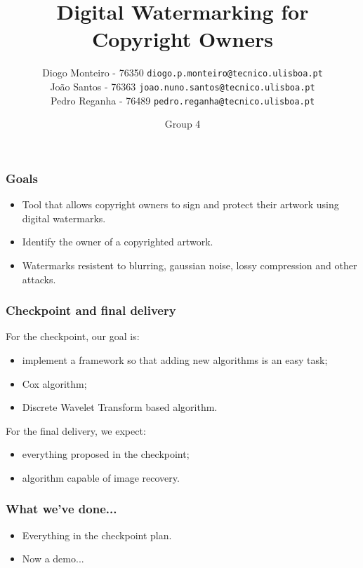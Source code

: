 \documentclass{beamer}
\begin{document}
	\begin{frame}
		\title{Digital Watermarking for Copyright Owners}
	\author{
	    Diogo Monteiro - 76350 \texttt{diogo.p.monteiro@tecnico.ulisboa.pt} \\
	    João Santos - 76363 \texttt{joao.nuno.santos@tecnico.ulisboa.pt} \\
	    Pedro Reganha - 76489 \texttt{pedro.reganha@tecnico.ulisboa.pt} \\
	}
	\date{Group 4}
		\maketitle
	\end{frame}
  \begin{frame}
    \frametitle{Goals}
    \begin{itemize}
    	\item Tool that allows copyright owners to sign and protect their artwork using digital watermarks.
    	\item Identify the owner of a copyrighted artwork.
    	\item Watermarks resistent to blurring, gaussian noise, lossy compression and other attacks.
    \end{itemize}
  \end{frame}
  \begin{frame}
    \frametitle{Checkpoint and final delivery}
    For the checkpoint, our goal is:

    \begin{itemize}
        \item implement a framework so that adding new algorithms is an easy task;
        \item Cox algorithm;
        \item Discrete Wavelet Transform based algorithm.
    \end{itemize}
    
For the final delivery, we expect:
    \begin{itemize}
        \item everything proposed in the checkpoint;
        \item algorithm capable of image recovery.
    \end{itemize}
  \end{frame}

  \begin{frame}
  \frametitle{What we've done...}
    \begin{itemize}
        \item Everything in the checkpoint plan.
        \item Now a demo...
    \end{itemize}
  \end{frame}
\end{document}
